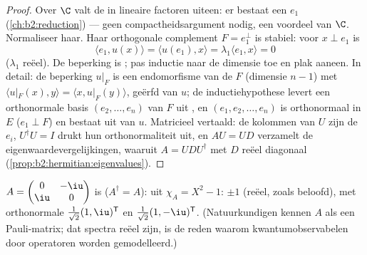 \begin{proof}
Over $\C$ valt de  in lineaire factoren
uiteen: er bestaat een  $e_1$ (\cref{ch:b2:reduction})
--- geen compactheidsargument nodig, een voordeel van $\C$.
Normaliseer haar. Haar orthogonale complement $F = e_1^\perp$ is
stabiel: voor $x \perp e_1$ is
\[
\langle e_1, u(x)\rangle = \langle u(e_1), x\rangle
= \lambda_1\langle e_1, x\rangle = 0
\]
($\lambda_1$ reëel). De beperking is ; pas inductie naar
de dimensie toe en plak aaneen. In detail: de beperking $u|_F$ is
een endomorfisme van de  $F$ (dimensie $n - 1$)
met $\langle u|_F(x), y\rangle = \langle x, u|_F(y)\rangle$, geërfd
van $u$; de inductiehypothese levert een orthonormale basis $(e_2,
\dots, e_n)$ van $F$ uit , en $(e_1, e_2, \dots, e_n)$
is orthonormaal in $E$ ($e_1 \perp F$) en bestaat uit
 van $u$. Matricieel vertaald: de kolommen van $U$
zijn de $e_i$, $U^\dagger U = I$ drukt hun orthonormaliteit uit, en
$AU = UD$ verzamelt de eigenwaardevergelijkingen, waaruit $A =
UDU^\dagger$ met $D$ reëel diagonaal
(\cref{prop:b2:hermitian:eigenvalues}).
\end{proof}

\begin{example}\label{ex:b2:hermitian:pauli}
$A = \begin{pmatrix} 0 & -\iu\\ \iu & 0\end{pmatrix}$ is 
($A^\dagger = A$):  uit $\chi_A = X^2 - 1$: $\pm 1$
(reëel, zoals beloofd), met orthonormale 
$\frac{1}{\sqrt2}(1, \iu)^{\mathsf T}$ en $\frac{1}{\sqrt2}(1,
-\iu)^{\mathsf T}$. (Natuurkundigen kennen $A$ als een
Pauli-matrix; dat  spectra reëel zijn, is de reden
waarom kwantumobservabelen door  operatoren worden
gemodelleerd.)
\end{example}

